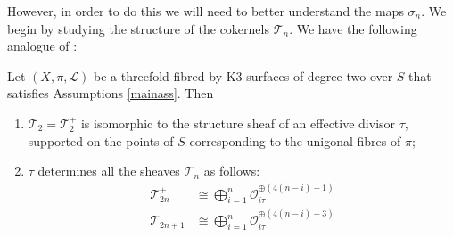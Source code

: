 \documentclass{amsart}
\begin{document}
However, in order to do this we will need to better understand the maps $\sigma_n$. We begin by studying the structure of the cokernels ${\mathcal{T}}_n$. We have the following analogue of \cite[Lemma 4.1]{flgi}:

\begin{lemma} \label{Tprops} Let $(X,\pi,{\mathcal{L}})$ be a threefold fibred by K3 surfaces of degree two over $S$ that satisfies Assumptions \ref{mainass}. Then
\begin{enumerate}
\item ${\mathcal{T}}_2 = {\mathcal{T}}_2^+$ is isomorphic to the structure sheaf of an effective divisor $\tau$, supported on the points of $S$ corresponding to the unigonal fibres of $\pi$;
\item $\tau$ determines all the sheaves ${\mathcal{T}}_n$ as follows:
\begin{align*}
{\mathcal{T}}_{2n}^+ & \cong   \bigoplus_{i=1}^{n} {\mathcal{O}}_{i\tau}^{\oplus(4(n-i)+1)}\\
{\mathcal{T}}_{2n+1}^- & \cong  \bigoplus_{i=1}^n {\mathcal{O}}_{i\tau}^{\oplus(4(n-i)+3)}
\end{align*}
\end{enumerate}
\end{lemma}
\end{document}
